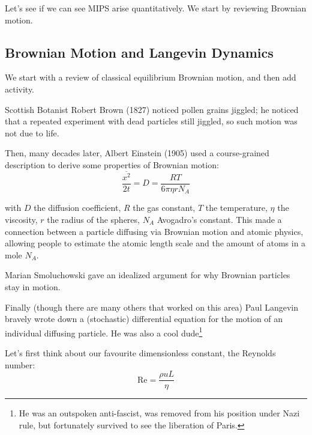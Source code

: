 Let's see if we can see MIPS arise quantitatively. We start by reviewing Brownian motion.

\subsection{Brownian Motion and Langevin Dynamics}
We start with a review of classical equilibrium Brownian motion, and then add activity.

Scottish Botanist Robert Brown (1827) noticed pollen grains jiggled; he noticed that a repeated experiment with dead particles still jiggled, so such motion was not due to life. 

Then, many decades later, Albert Einstein (1905) used a course-grained description to derive some properties of Brownian motion:
\begin{equation}
    \frac{\overline{x^2}}{2t} = D = \frac{RT}{6\pi \eta r N_A}
\end{equation}

with $D$ the diffusion coefficient, $R$ the gas constant, $T$ the temperature, $\eta$ the viscosity, $r$ the radius of the spheres, $N_A$ Avogadro's constant. This made a connection between a particle diffusing via Brownian motion and atomic physics, allowing people to estimate the atomic length scale and the amount of atoms in a mole $N_A$.

Marian Smoluchowski gave an idealized argument for why Brownian particles stay in motion.

Finally (though there are many others that worked on this area) Paul Langevin bravely wrote down a (stochastic) differential equation for the motion of an individual diffusing particle. He was also a cool dude\footnote{He was an outspoken anti-fascist, was removed from his position under Nazi rule, but fortunately survived to see the liberation of Paris.}

Let's first think about our favourite dimensionless constant, the Reynolds number:
\begin{equation}
    \text{Re} = \frac{\rho u L}{\eta}
\end{equation}

